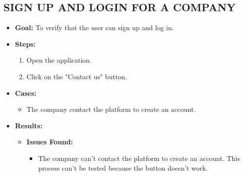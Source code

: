 \subsection{SIGN UP AND LOGIN FOR A COMPANY}\label{subsec:sign-up-and-login-for-a-company}
\begin{itemize}
    \item \textbf{Goal:} To verify that the user can sign up and log in.

    \item \textbf{Steps:}
    \begin{enumerate}
        \item Open the application.
        \item Click on the "Contact us" button.
    \end{enumerate}
    \item \textbf{Cases:}
    \begin{itemize}
        \item The company contact the platform to create an account.
    \end{itemize}
    \item \textbf{Results:}
    \begin{itemize}
        \item \textbf{Issues Found:}
        \begin{itemize}
            \item The company can't contact the platform to create an account. This process can't be tested because the button doesn't work.
        \end{itemize}
    \end{itemize}
\end{itemize}

